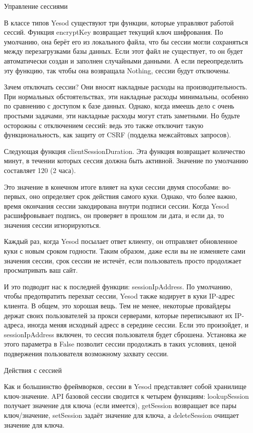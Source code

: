 Управление сессиями

В классе типов Yesod существуют три функции, которые управляют работой
сессий. Функция encryptKey возвращает текущий ключ шифрования. По
умолчанию, она берёт его из локального файла, что бы сессии могли
сохраняться между перезагрузками базы данных. Если этот файл не
существует, то он будет автоматически создан и заполнен случайными
данными. А если переопределить эту функцию, так чтобы она возвращала
Nothing, сессии будут отключены.

Зачем отключать сессии? Они вносят накладные расходы на
производительность. При нормальных обстоятельствах, эти накладные
расходы минимальны, особенно по сравнению с доступом к базе данных.
Однако, когда имеешь дело с очень простыми задачами, эти накладные
расходы могут стать заметными. Но будьте осторожны с отключением 
сессий: ведь это также отключит такую функциональность, как защиту 
от CSRF (подделка межсайтовых запросов).

Следующая функция clientSessionDuration. Эта функция возвращает
количество минут, в течении которых сессия должна быть активной.
Значение по умолчанию составляет 120 (2 часа).

Это значение в конечном итоге влияет на куки сессии двумя способами:
во-первых, оно определяет срок действия самого куки. Однако, что более
важно, время окончания сессии закодирована внутри подписи сессии.
Когда Yesod расшифровывает подпись, он проверяет в прошлом ли дата, и
если да, то значения сессии игнорируються.

Каждый раз, когда Yesod посылает ответ клиенту, он отправляет
обновленное куки с новым сроком годности. Таким образом, даже если вы
не изменяете сами значения сессии, срок сессии не истечёт, если
пользователь просто продолжает просматривать ваш сайт.

И это подводит нас к последней функции: sessionIpAddress. По
умолчанию, чтобы предотвратить перехват сессии, Yesod также кодирует в
куки IP-адрес клиента. В общем, это хорошая вещь. Тем не менее, 
некоторые провайдеры держат своих пользователей за прокси серверами,
которые переписывают их IP-адреса, иногда меняя исходный адресс в
середине сессии. Если это произойдет, и sessionIpAddress включен, то
сессия пользователя будет сброшена. Установка же этого параметра в False
позволит сессии продолжать в таких условиях, ценой подвержения
пользователя возможному захвату сессии.

Действия с сессией

Как и большинство фреймворков, сессии в Yesod представляет собой
хранилище ключ-значение. API базовой сессии сводится к четырем
функциям: lookupSession получает значение для ключа (если имеется),
getSession возвращает все пары ключ/значение, setSession задаёт
значение для ключа, а deleteSession очищает значение для ключа.


